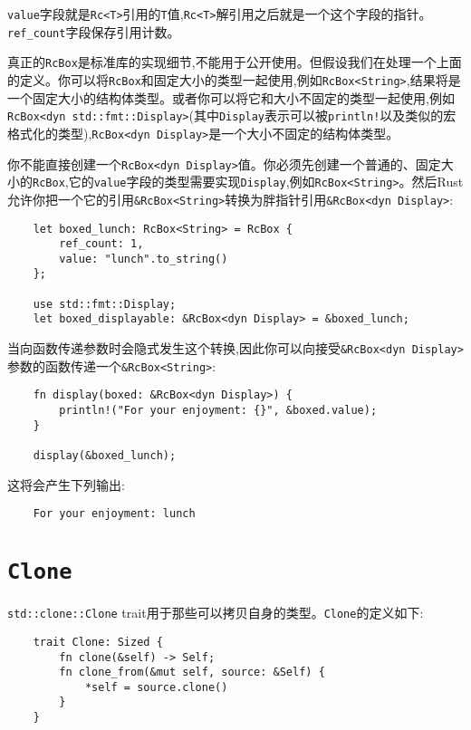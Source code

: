 \texttt{value}字段就是\texttt{Rc<T>}引用的\texttt{T}值,\texttt{Rc<T>}解引用之后就是一个这个字段的指针。\texttt{ref\_count}字段保存引用计数。

真正的\texttt{RcBox}是标准库的实现细节,不能用于公开使用。但假设我们在处理一个上面的定义。你可以将\texttt{RcBox}和固定大小的类型一起使用,例如\texttt{RcBox<String>},结果将是一个固定大小的结构体类型。或者你可以将它和大小不固定的类型一起使用,例如\texttt{RcBox<dyn std::fmt::Display>}(其中\texttt{Display}表示可以被\texttt{println!}以及类似的宏格式化的类型),\texttt{RcBox<dyn Display>}是一个大小不固定的结构体类型。

你不能直接创建一个\texttt{RcBox<dyn Display>}值。你必须先创建一个普通的、固定大小的\texttt{RcBox},它的\texttt{value}字段的类型需要实现\texttt{Display},例如\texttt{RcBox<String>}。然后Rust允许你把一个它的引用\texttt{\&RcBox<String>}转换为胖指针引用\texttt{\&RcBox<dyn Display>}:
\begin{verbatim}
    let boxed_lunch: RcBox<String> = RcBox {
        ref_count: 1,
        value: "lunch".to_string()
    };

    use std::fmt::Display;
    let boxed_displayable: &RcBox<dyn Display> = &boxed_lunch;
\end{verbatim}

当向函数传递参数时会隐式发生这个转换,因此你可以向接受\texttt{\&RcBox<dyn Display>}参数的函数传递一个\texttt{\&RcBox<String>}:
\begin{verbatim}
    fn display(boxed: &RcBox<dyn Display>) {
        println!("For your enjoyment: {}", &boxed.value);
    }

    display(&boxed_lunch);
\end{verbatim}

这将会产生下列输出:
\begin{verbatim}
    For your enjoyment: lunch
\end{verbatim}

\section{\texttt{Clone}}\label{clone}

\texttt{std::clone::Clone} trait用于那些可以拷贝自身的类型。\texttt{Clone}的定义如下:
\begin{verbatim}
    trait Clone: Sized {
        fn clone(&self) -> Self;
        fn clone_from(&mut self, source: &Self) {
            *self = source.clone()
        }
    }
\end{verbatim}


